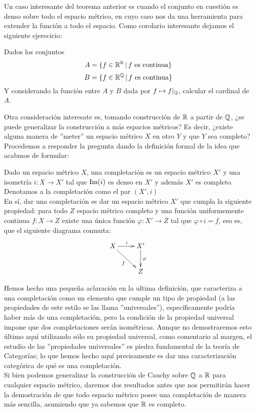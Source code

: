 \documentclass[12pt,a4paper]{book}
\begin{document}
Un caso interesante del teorema anterior es cuando el conjunto en cuestión es denso sobre todo el espacio métrico, en cuyo caso nos da una herramienta para extender la función a todo el espacio. Como corolario interesante dejamos el siguiente ejerecicio:
\begin{ej}
Dados los conjuntos 
$$A= \{ f \in \mathbb{R}^{\mathbb{R}} \,\vert\, f \mbox{ es continua}\}$$$$B = \{ f \in \mathbb{R}^{\mathbb{Q}} \,\vert\, f \mbox{ es continua}\}$$
Y considerando la función entre $A$ y $B$ dada por $ f \mapsto f\vert_{\mathbb{Q}}$, calcular el cardinal de $A$.
\end{ej}
Otra consideración interesate es, tomando construcción de $\mathbb{R}$ a partir de $\mathbb{Q}$, ¿se puede generalizar la construcción a más espacios métricos? Es decir, ¿existe alguna manera de ''meter'' un espacio métrico $X$ en otro $Y$ y que $Y$ sea completo? Procedemos a responder la pregunta dando la definición formal de la idea que acabmos de formular:
\begin{defi}
Dado un espacio métrico $X$, una completación es un espacio métrico $X'$ y una isometría $i: X \rightarrow X'$ tal que $\mbox{Im}(i)$ es denso en $X'$ y además $X'$ es completo. Denotamos a la completación como el par $(X',i)$\\
En sí, dar una completación es dar un espacio métrico $X'$ que cumpla la siguiente propiedad: para todo $Z$ espacio métrico completo y una función uniformemente continua $f:X \rightarrow Z$ existe una única función $\varphi:X' \rightarrow Z$ tal que $\varphi \circ i = f$, eso es, que el siguiente diagrama conmuta:
$$\xymatrix{
X \ar[dr]_f \ar[r]^i &X' \ar[d]^{\varphi}\\
  &Z
  }
$$

\end{defi}
Hemos hecho una pequeña aclaración en la ultima definición, que caracteriza a una completación como un elemento que cumple un tipo de propiedad (a las propiedades de este estilo se las llama ''universales''), específicamente podría haber más de una completación, pero la condición de la propiedad universal impone que dos completaciones serán isométricas. Aunque no demostraremos esto último aquí utilizando sólo su propiedad universal, como comentario al margen, el estudio de las ''propiedades universales'' es piedra fundamental de la teoría de Categorías; lo que hemos hecho aquí precisamente es dar una caracterización categórica de qué es una completación.\\[0.5cm]
Si bien podemos generalizar la construcción de Cauchy sobre $\mathbb{Q}$ a $\mathbb{R}$ para cualquier espacio métrico, daremos dos resultados antes que nos permitirán hacer la demostración de que todo espacio métrico posee una completación de manera más sencilla, asumiendo que ya sabemos que $\mathbb{R}$ es completo.
\end{document}
